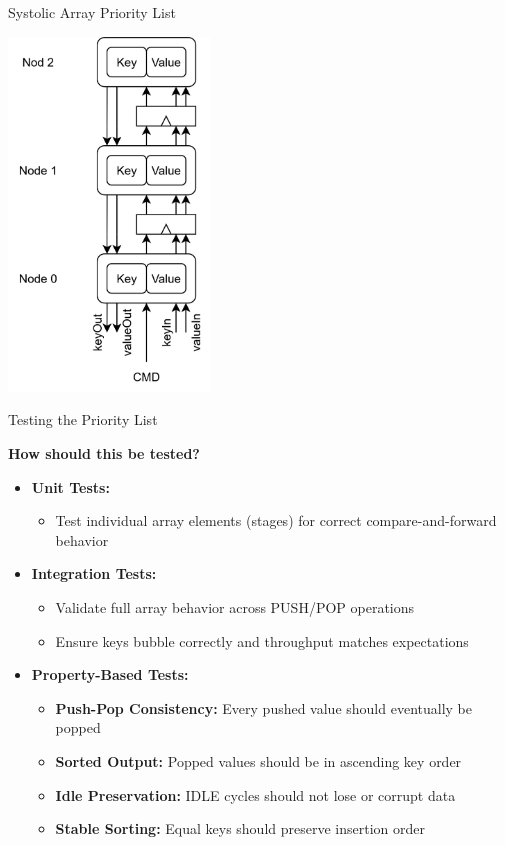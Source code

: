 \begin{frame}{Systolic Array Priority List}
\centering

\begin{center}
	\includegraphics[width=0.4\textwidth]{images/prio-list.png}
\end{center}
\end{frame}

\begin{frame}{Testing the Priority List}
	
	\textbf{How should this be tested?}
	\pause
	\begin{itemize}
		\item \textbf{Unit Tests:} 
		\begin{itemize}
			\item Test individual array elements (stages) for correct compare-and-forward behavior
		\end{itemize}
		
		\item \textbf{Integration Tests:}
		\begin{itemize}
			\item Validate full array behavior across PUSH/POP operations
			\item Ensure keys bubble correctly and throughput matches expectations
		\end{itemize}
		
		\item \textbf{Property-Based Tests:}
		\begin{itemize}
			\item \textbf{Push-Pop Consistency:} Every pushed value should eventually be popped
			\item \textbf{Sorted Output:} Popped values should be in ascending key order
			\item \textbf{Idle Preservation:} IDLE cycles should not lose or corrupt data
			\item \textbf{Stable Sorting:} Equal keys should preserve insertion order
		\end{itemize}
	\end{itemize}
	
\end{frame}

